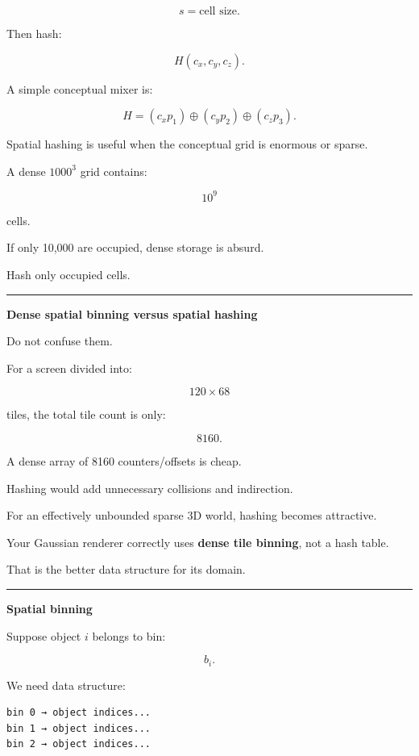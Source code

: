 \[
s=\text{cell size}.
\]

Then hash:

\[
H(c_x,c_y,c_z).
\]

A simple conceptual mixer is:

\[
H=
(c_xp_1)
\oplus
(c_yp_2)
\oplus
(c_zp_3).
\]

Spatial hashing is useful when the conceptual grid is enormous or sparse.

A dense \(1000^3\) grid contains:

\[
10^9
\]

cells.

If only 10,000 are occupied, dense storage is absurd.

Hash only occupied cells.

\begin{center}\rule{0.5\linewidth}{0.5pt}\end{center}

\textbf{Dense spatial binning versus spatial hashing}

Do not confuse them.

For a screen divided into:

\[
120\times68
\]

tiles, the total tile count is only:

\[
8160.
\]

A dense array of 8160 counters/offsets is cheap.

Hashing would add unnecessary collisions and indirection.

For an effectively unbounded sparse 3D world, hashing becomes attractive.

Your Gaussian renderer correctly uses \textbf{dense tile binning}, not a hash table.

That is the better data structure for its domain.

\begin{center}\rule{0.5\linewidth}{0.5pt}\end{center}

\textbf{Spatial binning}

Suppose object \(i\) belongs to bin:

\[
b_i.
\]

We need data structure:

\protect{}\label{p10-csr-bins}%
\begin{verbatim}
bin 0 → object indices...
bin 1 → object indices...
bin 2 → object indices...
\end{verbatim}


